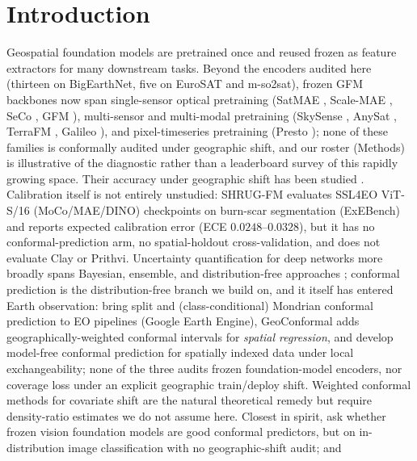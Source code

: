 \documentclass[11pt]{article}
\begin{document}
\section{Introduction}\label{sec:intro}
Geospatial foundation models are pretrained once and reused frozen as feature extractors for many downstream
tasks. Beyond the encoders audited here (thirteen on BigEarthNet, five on EuroSAT and m-so2sat), frozen GFM
backbones now span single-sensor optical pretraining
(SatMAE \citep{cong2022satmae}, Scale-MAE \citep{reed2023scalemae}, SeCo \citep{manas2021seasonal}, GFM
\citep{mendieta2023gfm}), multi-sensor and multi-modal pretraining (SkySense
\citep{guo2024skysense}, AnySat \citep{astruc2025anysat}, TerraFM \citep{danish2025terrafm}, Galileo
\citep{tseng2025galileo}), and pixel-timeseries pretraining (Presto \citep{tseng2023presto}); none of these
families is conformally audited under geographic shift, and our roster (Methods) is illustrative
of the diagnostic rather than a leaderboard survey of this rapidly growing space. Their accuracy under geographic shift has been studied \citep{cohrs2025shrugfm,tamazyan2025geocrossbench}. Calibration itself
is not entirely unstudied: SHRUG-FM \citep{cohrs2025shrugfm} evaluates SSL4EO ViT-S/16 (MoCo/MAE/DINO) checkpoints on
burn-scar segmentation (ExEBench) and reports expected calibration error (ECE $0.0248$--$0.0328$), but it has
no conformal-prediction arm, no spatial-holdout cross-validation, and does not evaluate Clay or Prithvi.
Uncertainty quantification for deep networks more broadly spans Bayesian, ensemble, and distribution-free
approaches \citep{gawlikowski2023survey}; conformal prediction is the distribution-free branch we build on, and
it itself has entered Earth observation: \citet{singh2024uncertainty} bring split and
(class-conditional) Mondrian conformal prediction to EO pipelines (Google Earth Engine), GeoConformal
\citep{lou2024geoconformal} adds geographically-weighted conformal intervals for \emph{spatial regression}, and
\citet{mao2024spatial} develop model-free conformal prediction for spatially indexed data under local
exchangeability; none of the three audits frozen foundation-model encoders, nor coverage loss under an explicit geographic
train/deploy shift. Weighted conformal methods for covariate shift \citep{tibshirani2019covariate} are the natural
theoretical remedy but require density-ratio estimates we do not assume here.
Closest in spirit, \citet{fillioux2024fmconformal} ask whether frozen vision foundation models are good
conformal predictors, but on in-distribution image classification with no geographic-shift audit; and
\end{document}
